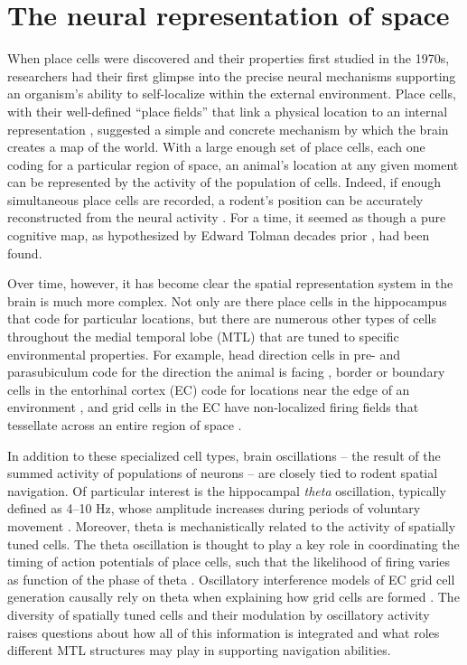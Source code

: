 \section{The neural representation of space}


When place cells were discovered and their properties first studied in the 1970s, researchers had their first glimpse into the precise neural mechanisms supporting an organism's ability to self-localize within the external environment. Place cells, with their well-defined ``place fields'' that link a physical location to an internal representation \citep{OKeeNade78}, suggested a simple and concrete mechanism by which the brain creates a map of the world. With a large enough set of place cells, each one coding for a particular region of space, an animal's location at any given moment can be represented by the activity of the population of cells. Indeed, if enough simultaneous place cells are recorded, a rodent's position can be accurately reconstructed from the neural activity \citep{WilsMcNa93,ZhanEtal98}. For a time, it seemed as though a pure cognitive map, as hypothesized by Edward Tolman decades prior \citep{Tolm48}, had been found.

Over time, however, it has become clear the spatial representation system in the brain is much more complex. Not only are there place cells in the hippocampus that code for particular locations, but there are numerous other types of cells throughout the medial temporal lobe (MTL) that are tuned to specific environmental properties. For example, head direction cells in pre- and parasubiculum code for the direction the animal is facing \citep{TaubEtal90}, border or boundary cells in the entorhinal cortex (EC) code for locations near the edge of an environment \citep{SolsEtal08}, and grid cells in the EC have non-localized firing fields that tessellate across an entire region of space \citep{HaftEtal05}.

In addition to these specialized cell types, brain oscillations -- the result of the summed activity of populations of neurons \citep{LachEtal03} -- are closely tied to rodent spatial navigation. Of particular interest is the hippocampal \textit{theta} oscillation, typically defined as 4--10 Hz, whose amplitude increases during periods of voluntary movement \citep{Vand69}. Moreover, theta is mechanistically related to the activity of spatially tuned cells. The theta oscillation is thought to play a key role in coordinating the timing of action potentials of place cells, such that the likelihood of firing varies as function of the phase of theta \citep{OKeeRecc93,SkagEtal96}. Oscillatory interference models of EC grid cell generation causally rely on theta when explaining how grid cells are formed \citep{BurgEtal07}. The diversity of spatially tuned cells and their modulation by oscillatory activity raises questions about how all of this information is integrated and what roles different MTL structures may play in supporting navigation abilities.

